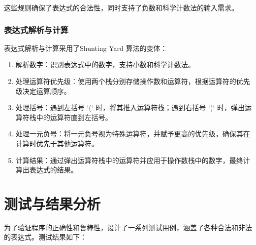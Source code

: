 \documentclass{article}
\begin{document}
这些规则确保了表达式的合法性，同时支持了负数和科学计数法的输入需求。


    \subsubsection{表达式解析与计算}
    表达式解析与计算采用了Shunting Yard 算法的变体：
    \begin{enumerate}
        \item {解析数字}：识别表达式中的数字，支持小数和科学计数法。
        \item {处理运算符优先级}：使用两个栈分别存储操作数和运算符，根据运算符的优先级决定运算顺序。
        \item {处理括号}：遇到左括号 `(` 时，将其推入运算符栈；遇到右括号 `)` 时，弹出运算符栈中的运算符直到左括号。
        \item {处理一元负号}：将一元负号视为特殊运算符，并赋予更高的优先级，确保其在计算时优先于其他运算符。
        \item {计算结果}：通过弹出运算符栈中的运算符并应用于操作数栈中的数字，最终计算出表达式的结果。
    \end{enumerate}


    \section{测试与结果分析}
    为了验证程序的正确性和鲁棒性，设计了一系列测试用例，涵盖了各种合法和非法的表达式。测试结果如下：
\end{document}
